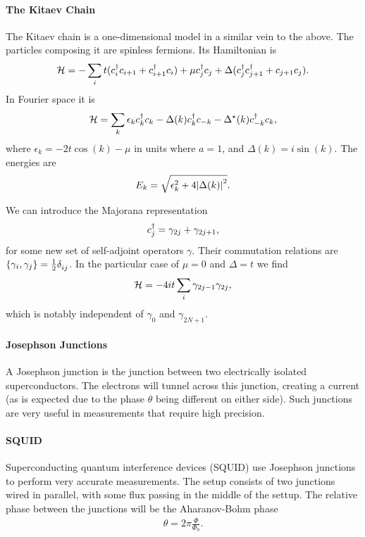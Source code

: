 \paragraph{The Kitaev Chain}
The Kitaev chain is a one-dimensional model in a similar vein to the above. The particles composing it are spinless fermions. Its Hamiltonian is
\begin{align*}
	\mathcal{H} = -\sum\limits_{i}t(c_{i}^{\dagger} c_{i + 1} + c_{i + 1}^{\dagger} c_{i}) + \mu c_{j}^{\dagger} c_{j} + \Delta(c_{j}^{\dagger} c_{j + 1}^{\dagger} + c_{j + 1}c_{j}).
\end{align*}
In Fourier space it is
\begin{align*}
	\mathcal{H} = \sum\limits_{k}\epsilon_{k}c_{k}^{\dagger} c_{k} - \Delta(k)c_{k}^{\dagger} c_{-k} - \Delta^{\star}(k)c_{-k}^{\dagger} c_{k},
\end{align*}
where $\epsilon_{k} = -2t\cos(k) - \mu$ in units where $a = 1$, and $\Delta(k) = i\sin(k)$. The energies are
\begin{align*}
	E_{k} = \sqrt{\epsilon_{k}^{2} + 4\abs{\Delta(k)}^{2}}.
\end{align*}

We can introduce the Majorana representation
\begin{align*}
	c_{j}^{\dagger} = \gamma_{2j} + \gamma_{2j + 1},
\end{align*}
for some new set of self-adjoint operators $\gamma$. Their commutation relations are $\acomm{\gamma_{i}}{\gamma_{j}} = \frac{1}{2}\kdelta{}{ij}$. In the particular case of $\mu = 0$ and $\Delta = t$ we find
\begin{align*}
	\mathcal{H} = -4it\sum\limits_{i}\gamma_{2j - 1}\gamma_{2j},
\end{align*}
which is notably independent of $\gamma_{0}$ and $\gamma_{2N + 1}$.

\paragraph{Josephson Junctions}
A Josephson junction is the junction between two electrically isolated superconductors. The electrons will tunnel across this junction, creating a current (as is expected due to the phase $\theta$ being different on either side). Such junctions are very useful in measurements that require high precision.

\paragraph{SQUID}
Superconducting quantum interference devices (SQUID) use Josephson junctions to perform very accurate measurements. The setup consists of two junctions wired in parallel, with some flux passing in the middle of the settup. The relative phase between the junctions will be the Aharanov-Bohm phase
\begin{align*}
	\theta = 2\pi\frac{\Phi}{\Phi_{0}}.
\end{align*}